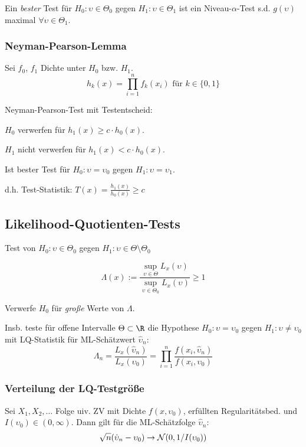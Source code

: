 Ein \emph{bester} Test für \(H_0 : \upsilon \in \Theta_0\) gegen \(H_1 : \upsilon \in \Theta_1\) ist ein Niveau-\(\alpha\)-Test s.d. \(g(\upsilon)\) maximal \(\forall \upsilon \in \Theta_1\).

\subsubsection*{Neyman-Pearson-Lemma}

Sei \(f_0\), \(f_1\) Dichte unter \(H_0\) bzw. \(H_1\).
\[ h_k(x) = \prod_{i=1}^n f_k(x_i) \text{ für } k \in \{0,1\} \]

Neyman-Pearson-Test mit Testentscheid:

\(H_0\) verwerfen für \(h_1(x) \geq c \cdot h_0(x)\).

\(H_1\) nicht verwerfen für \(h_1(x) < c \cdot h_0(x)\).

Ist bester Test für \(H_0 : \upsilon = \upsilon_0\) gegen \(H_1 : \upsilon = \upsilon_1\).

d.h. Test-Statistik: \(T(x) = \frac{h_1(x)}{h_0(x)} \geq c\)

\subsection*{Likelihood-Quotienten-Tests}

Test von \(H_0 : \upsilon \in \Theta_0\) gegen \(H_1 : \upsilon \in \Theta \setminus \Theta_0\)

\[ \Lambda(x) := \frac{\sup_{\upsilon \in \Theta} L_x(\upsilon)}{\sup_{\upsilon \in \Theta_0} L_x(\upsilon)} \geq 1 \]

Verwerfe \(H_0\) für \emph{große} Werte von \(\Lambda\).

Insb. teste für offene Intervalle \(\Theta \subset \R\) die Hypothese \(H_0 : \upsilon = \upsilon_0\) gegen \(H_1 : \upsilon \neq \upsilon_0\) mit LQ-Statistik für ML-Schätzwert \(\hat\upsilon_n\):
\[ \Lambda_n = \frac{L_x(\hat\upsilon_n)}{L_x(\upsilon_0)} = \prod_{i=1}^n \frac{f(x_i,\hat\upsilon_n)}{f(x_i,\upsilon_0)} \]

\subsubsection*{Verteilung der LQ-Testgröße}

Sei \(X_1,X_2,\dots\) Folge uiv. ZV mit Dichte \(f(x,\upsilon_0)\), erfüllten Regularitätsbed. und \(I(\upsilon_0) \in (0,\infty)\). Dann gilt für die ML-Schätzfolge \(\hat\upsilon_n\):
\[ \sqrt{n}(\hat\upsilon_n - \upsilon_0) \to \mathcal{N}(0,1/I(\upsilon_0)) \]

